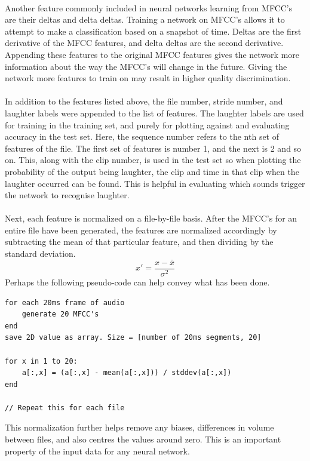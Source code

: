 \documentclass[a4paper,11pt,notitlepage]{article}
\begin{document}
\\
Another feature commonly included in neural networks learning from MFCC's are their deltas and delta deltas. Training a network on MFCC's allows it to attempt to make a classification based on a snapshot of time. Deltas are the first derivative of the MFCC features, and delta deltas are the second derivative. Appending these features to the original MFCC features gives the network more information about the way the MFCC's will change in the future. Giving the network more features to train on may result in higher quality discrimination.\\
\\
In addition to the features listed above, the file number, stride number, and laughter labels were appended to the list of features. The laughter labels are used for training in the training set, and purely for plotting against and evaluating accuracy in the test set. Here, the sequence number refers to the nth set of features of the file. The first set of features is number 1, and the next is 2 and so on. This, along with the clip number, is used in the test set so when plotting the probability of the output being laughter, the clip and time in that clip when the laughter occurred can be found. This is helpful in evaluating which sounds trigger the network to recognise laughter.\\
\\
Next, each feature is normalized on a file-by-file basis. After the MFCC's for an entire file have been generated, the features are normalized accordingly by subtracting the mean of that particular feature, and then dividing by the standard deviation.
\begin{equation}
	x\prime = \frac{x - \bar{x}}{\sigma^2}
\end{equation}
Perhaps the following pseudo-code can help convey what has been done.
\begin{lstlisting}
for each 20ms frame of audio
    generate 20 MFCC's
end
save 2D value as array. Size = [number of 20ms segments, 20]

for x in 1 to 20:
    a[:,x] = (a[:,x] - mean(a[:,x])) / stddev(a[:,x])
end

// Repeat this for each file
\end{lstlisting}
This normalization further helps remove any biases, differences in volume between files, and also centres the values around zero. This is an important property of the input data for any neural network.\cite{lecun2012efficient}
\end{document}
